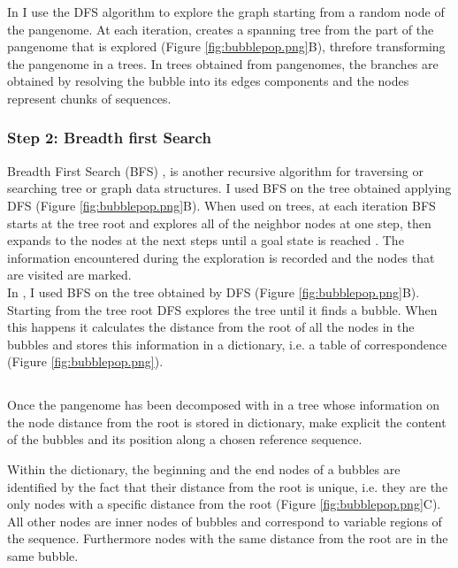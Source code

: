 In \bbp I use the DFS algorithm to explore the graph starting from a random node of the pangenome. At each iteration, \bbp creates a spanning tree from the part of the pangenome that is explored (Figure \ref{fig:bubblepop.png}B), threfore transforming the pangenome in a trees. In trees obtained from pangenomes, the branches are obtained by resolving the bubble into its edges components and the nodes represent chunks of sequences.  

\subsubsection{Step 2: Breadth first Search}
Breadth First Search (BFS) \cite{beamer2012direction,programiz.com}, is another recursive algorithm for traversing or searching tree or graph data structures. I used BFS on the tree obtained applying DFS (Figure \ref{fig:bubblepop.png}B). When used on trees, at each iteration BFS starts at the tree root and explores all of the neighbor nodes at one step, then expands to the nodes at the next steps until a goal state is reached \cite{korf1985depth, wiki:BFS}. The information encountered during the exploration is recorded and the nodes that are visited are marked.\\  
 
In \bbp, I used BFS on the tree obtained by DFS (Figure \ref{fig:bubblepop.png}B). Starting from the tree root DFS explores the tree until it finds a bubble. When this happens it calculates the distance from the root of all the nodes in the bubbles and stores this information in a dictionary, i.e. a table of correspondence (Figure \ref{fig:bubblepop.png}). 


\subsection{\bbc}
Once the pangenome has been decomposed with \bbp in a tree whose information on the node distance from the root is stored in dictionary, \bbc make explicit the content of the bubbles and its position along a chosen reference sequence.    

Within the dictionary, the beginning and the end nodes of a bubbles are identified by the fact that their distance from the root is unique, i.e. they are the only nodes with a specific distance from the root (Figure \ref{fig:bubblepop.png}C). All other nodes are inner nodes of bubbles and correspond to variable regions of the sequence. Furthermore nodes with the same distance from the root are in the same bubble.\\

